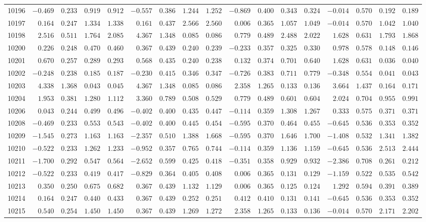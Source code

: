 \begin{landscape}
{\begin{longtable}{l|rrrr|rrrr|rrrr|rrrr}
10196&$-0.469$&$0.233$&$0.919$&$0.912$&$-0.557$&$0.386$&$1.244$&$1.252$&$-0.869$&$0.400$&$0.343$&$0.324$&$-0.014$&$0.570$&$0.192$&$0.189$\tabularnewline
10197&$ 0.164$&$0.247$&$1.334$&$1.338$&$ 0.161$&$0.437$&$2.566$&$2.560$&$ 0.006$&$0.365$&$1.057$&$1.049$&$-0.014$&$0.570$&$1.042$&$1.040$\tabularnewline
10198&$ 2.516$&$0.511$&$1.764$&$2.085$&$ 4.367$&$1.348$&$0.085$&$0.086$&$ 0.779$&$0.489$&$2.488$&$2.022$&$ 1.628$&$0.631$&$1.793$&$1.868$\tabularnewline
10200&$ 0.226$&$0.248$&$0.470$&$0.460$&$ 0.367$&$0.439$&$0.240$&$0.239$&$-0.233$&$0.357$&$0.325$&$0.330$&$ 0.978$&$0.578$&$0.148$&$0.146$\tabularnewline
10201&$ 0.670$&$0.257$&$0.289$&$0.293$&$ 0.568$&$0.435$&$0.240$&$0.238$&$ 0.132$&$0.374$&$0.701$&$0.640$&$ 1.628$&$0.631$&$0.036$&$0.040$\tabularnewline
10202&$-0.248$&$0.238$&$0.185$&$0.187$&$-0.230$&$0.415$&$0.346$&$0.347$&$-0.726$&$0.383$&$0.711$&$0.779$&$-0.348$&$0.554$&$0.041$&$0.043$\tabularnewline
10203&$ 4.338$&$1.368$&$0.043$&$0.045$&$ 4.367$&$1.348$&$0.085$&$0.086$&$ 2.358$&$1.265$&$0.133$&$0.136$&$ 3.664$&$1.437$&$0.164$&$0.171$\tabularnewline
10204&$ 1.953$&$0.381$&$1.280$&$1.112$&$ 3.360$&$0.789$&$0.508$&$0.529$&$ 0.779$&$0.489$&$0.601$&$0.604$&$ 2.024$&$0.704$&$0.955$&$0.991$\tabularnewline
10206&$ 0.043$&$0.244$&$0.499$&$0.496$&$-0.402$&$0.400$&$0.435$&$0.447$&$-0.114$&$0.359$&$1.308$&$1.267$&$ 0.333$&$0.575$&$0.371$&$0.371$\tabularnewline
10208&$-0.469$&$0.233$&$0.553$&$0.543$&$-0.402$&$0.400$&$0.445$&$0.454$&$-0.595$&$0.370$&$0.464$&$0.455$&$-0.645$&$0.536$&$0.353$&$0.352$\tabularnewline
10209&$-1.545$&$0.273$&$1.163$&$1.163$&$-2.357$&$0.510$&$1.388$&$1.668$&$-0.595$&$0.370$&$1.646$&$1.700$&$-1.408$&$0.532$&$1.341$&$1.382$\tabularnewline
10210&$-0.522$&$0.233$&$1.262$&$1.233$&$-0.952$&$0.357$&$0.765$&$0.744$&$-0.114$&$0.359$&$1.136$&$1.159$&$-0.645$&$0.536$&$2.513$&$2.444$\tabularnewline
10211&$-1.700$&$0.292$&$0.547$&$0.564$&$-2.652$&$0.599$&$0.425$&$0.418$&$-0.351$&$0.358$&$0.929$&$0.932$&$-2.386$&$0.708$&$0.261$&$0.212$\tabularnewline
10212&$-0.522$&$0.233$&$0.419$&$0.417$&$-0.829$&$0.364$&$0.405$&$0.408$&$ 0.006$&$0.365$&$0.131$&$0.129$&$-1.159$&$0.522$&$0.535$&$0.542$\tabularnewline
10213&$ 0.350$&$0.250$&$0.675$&$0.682$&$ 0.367$&$0.439$&$1.132$&$1.129$&$ 0.006$&$0.365$&$0.125$&$0.124$&$ 1.292$&$0.594$&$0.391$&$0.389$\tabularnewline
10214&$ 0.164$&$0.247$&$0.440$&$0.433$&$ 0.367$&$0.439$&$0.252$&$0.251$&$ 0.412$&$0.410$&$0.131$&$0.141$&$-0.645$&$0.536$&$0.353$&$0.352$\tabularnewline
10215&$ 0.540$&$0.254$&$1.450$&$1.450$&$ 0.367$&$0.439$&$1.269$&$1.272$&$ 2.358$&$1.265$&$0.133$&$0.136$&$-0.014$&$0.570$&$2.171$&$2.202$\tabularnewline

\end{longtable}}
\end{landscape}
